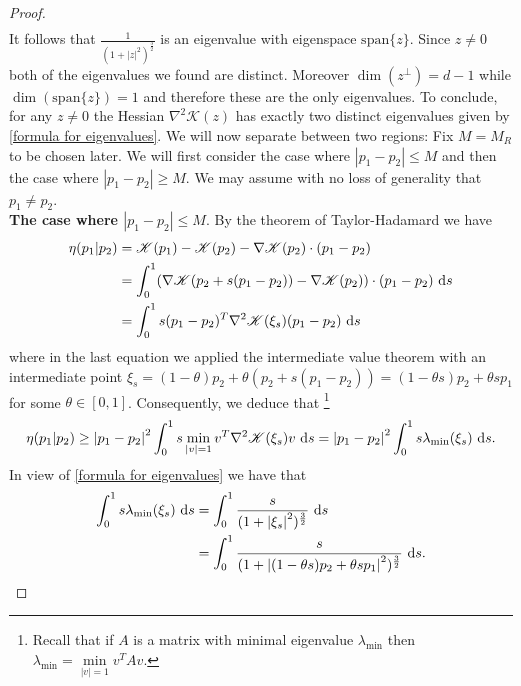 \documentclass[11pt,reqno]{amsart}
\numberwithin{equation}{section}
\def\dd{{\rm d}}
\begin{document}
\begin{proof}
\begin{align*}
\end{align*}
It follows that $\frac{1}{(1+\left\vert z\right\vert^{2})^{\frac{3}{2}}}$ is an eigenvalue with eigenspace $\mathrm{span}\{z\}$. Since $z\neq 0$ both of the eigenvalues we found are distinct. Moreover $\dim(z^{\perp})=d-1$ while $\dim(\mathrm{span}\{z\}{})=1$ and therefore these are the only eigenvalues. 
To conclude, for any $z\neq 0$ the Hessian  $\nabla^{2}\mathscr{K}(z)$ has exactly two distinct eigenvalues given by \ref{formula for eigenvalues}.
We will now separate between two regions: Fix $M=M_{R}$ to be chosen later.  We will first consider the case where $\left\vert p_{1}-p_{2}\right\vert\leq M $ and then the case where $\left\vert p_{1}-p
_{2}\right\vert\geq M$. We may assume with no loss of generality that $p_{1}\neq p_{2}$. \\ 
\textbf{The case where $\left\vert p_{1}-p_{2}\right\vert\leq M$}. By the theorem of Taylor-Hadamard we have 
\begin{align*}
\eta(p_{1}\vert p_{2})&=\mathscr{K}(p_{1})-\mathscr{K}(p_{2})-\nabla \mathscr{K}(p_{2})\cdot (p_{1}-p_{2})\\
&=\int_{0}^{1}(\nabla \mathscr{K}(p_{2}+s(p_{1}-p_{2}))-\nabla \mathscr{K}(p_{2}))\cdot (p_{1}-p_{2})\ \dd s\\
&= \int_{0}^{1} s(p_{1}-p_{2})^{T}\nabla^{2}\mathscr{K}(\xi_{s})(p_{1}-p_{2})\ \dd s
\end{align*}
where in the last equation we applied the intermediate value theorem with an intermediate point $\xi_{s}=(1-\theta )p_{2}+\theta(p_{2}+s(p_{1}-p_{2}))=(1-\theta s)p_{2}+\theta sp_{1}$ for some $\theta \in [0,1]$. Consequently, we deduce that \footnote{Recall that if $A$ is a matrix with minimal eigenvalue $\lambda_{\min}$ then $\lambda_{\min}=\underset{\left\vert v\right\vert=1 }{\min}v^{T}Av$. }  
\begin{align}
\eta(p_{1}\vert p_{2})\geq \left\vert p_{1}-p_{2}\right\vert^{2} \int_{0}^{1}s\min_{\left\vert v\right\vert=1 }v^{T}\nabla^{2}\mathscr{K}(\xi_{s})v\ \dd s
=\left\vert p_{1}-p_{2}\right\vert^{2} \int_{0}^{1}s\lambda_{\min}(\xi_{s})\ \dd s. \label{eta(p1p2) est in term integral}   
\end{align}
In view of \eqref{formula for eigenvalues} we have that 
\begin{align*}
\int_{0}^{1}s\lambda_{\min}(\xi_{s})\ \dd s&=\int_{0}^{1}\frac{s}{(1+\left\vert \xi_{s}\right\vert^{2})^{\frac{3}{2}}}\ \dd s\\
&=\int_{0}^{1}\frac{s}{(1+\left\vert (1-\theta s)p_{2}+\theta s p_{1}\right\vert^{2})^{\frac{3}{2}}}\ \dd s.    \end{align*}

\end{proof}
\end{document}

